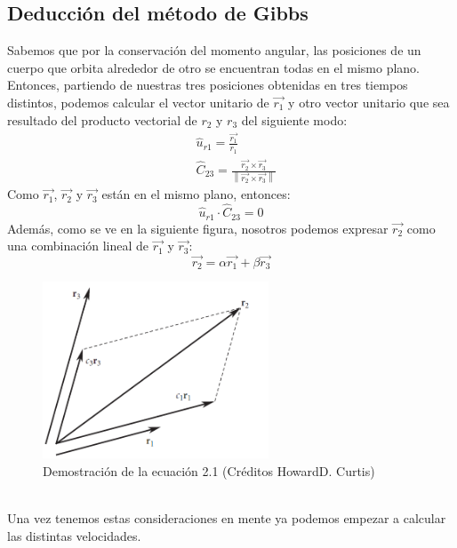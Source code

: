 \documentclass{article}
\numberwithin{equation}{section}
\begin{document}
\subsection{Deducción del método de Gibbs}
Sabemos que por la conservación del momento angular, 
las posiciones de un cuerpo que orbita alrededor de otro se encuentran todas 
en el mismo plano. Entonces, partiendo de nuestras tres posiciones 
obtenidas en tres tiempos distintos, podemos calcular el 
vector unitario de $\overrightarrow{r_{1}}$ y otro vector 
unitario que sea resultado del producto vectorial de $r_{2}$ y 
$r_{3}$ del siguiente modo: 
\begin{align*}
    &\hat{u}_{r1}=\frac{\overrightarrow{r_{1}}}{r_{1}} \\
    &\hat{C}_{23}=\frac{\overrightarrow{r_{2}}\times \overrightarrow{r_{3}}}{\left\lVert \overrightarrow{r_{2}}\times \overrightarrow{r_{3}} \right\rVert }  
\end{align*}
Como $\overrightarrow{r_{1}}$, $\overrightarrow{r_{2}}$ y 
$\overrightarrow{r_{3}}$ están en el mismo plano, entonces: 
\begin{equation*}
    \hat{u}_{r1}\cdot \hat{C}_{23}=0
\end{equation*}
Además, como se ve en la siguiente figura, nosotros podemos 
expresar $\overrightarrow{r_{2}}$ como una combinación lineal 
de $\overrightarrow{r_{1}}$ y $\overrightarrow{r_{3}}$: 
\begin{equation}
    \overrightarrow{r_{2}}=\alpha \overrightarrow{r_{1}}+\beta \overrightarrow{r_{3}}
\end{equation}
\begin{figure}[h]
    \centering
    \includegraphics[width=0.6\textwidth]{a.png}
    \caption{Demostración de la ecuación 2.1 (Créditos 
    HowardD. Curtis)}
\end{figure} \\

Una vez tenemos estas consideraciones en mente ya podemos 
empezar a calcular las distintas velocidades. \\
\end{document}

